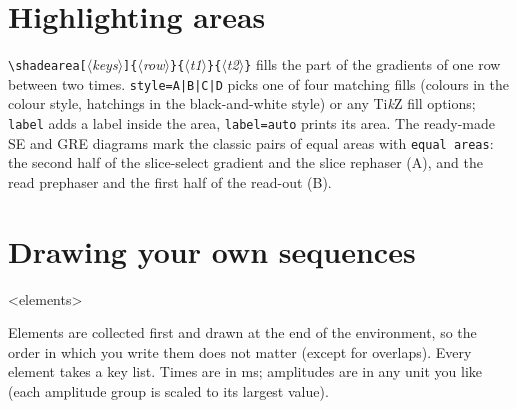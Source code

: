 \documentclass[11pt]{article}
\newcommand\cs[1]{\texttt{\textbackslash#1}}
\newcommand\key[1]{\texttt{#1}}
\newcommand\meta[1]{\ensuremath{\langle}\textit{#1}\ensuremath{\rangle}}
\newcommand\marg[1]{\texttt{\{}\meta{#1}\texttt{\}}}
\newcommand\oarg[1]{\texttt{[}\meta{#1}\texttt{]}}
\begin{document}
\section{Highlighting areas}\label{sec:shade}
\cs{shadearea}\oarg{keys}\marg{row}\marg{t1}\marg{t2} fills the part of the
gradients of one row between two times. \key{style=A|B|C|D} picks one of four
matching fills (colours in the colour style, hatchings in the black-and-white
style) or any Ti\emph{k}Z fill options; \key{label} adds a label inside the
area, \key{label=auto} prints its area. The ready-made SE and GRE diagrams mark
the classic pairs of equal areas with \key{equal areas}: the second half of the
slice-select gradient and the slice rephaser (A), and the read prephaser and the
first half of the read-out (B).
\begin{example}
\GradientEchoDiagram[rows={rf,gz,gx}, equal areas]
\end{example}
\begin{example}
\begin{mriseq}[rows={rf,gx}, ticks, style=bw]
\end{mriseq}
\end{example}

\section{Drawing your own sequences}\label{sec:own}

\begin{exampleonly}
\begin{mriseq}
  <elements>
\end{mriseq}
\end{exampleonly}

Elements are collected first and drawn at the end of the environment, so the
order in which you write them does not matter (except for overlaps). Every
element takes a key list. Times are in ms; amplitudes are in any unit you like
(each amplitude group is scaled to its largest value).

\begin{example}
\begin{mriseq}[rows={rf,gz,gx,sig}, ticks, grad labels=plain]
\end{mriseq}
\end{example}
\end{document}
